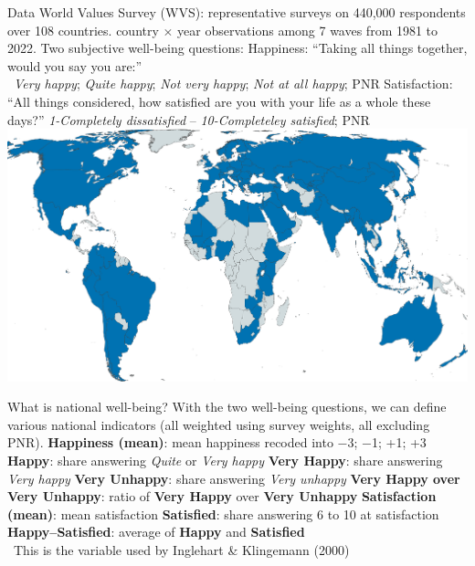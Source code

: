 \documentclass[aspectratio=169,xcolor=dvipsnames, 11pt,mathserif]{beamer}
\begin{document}
\begin{frame}{Data}
    \bbvsp
    \ip World Values Survey (WVS): representative surveys on 440,000 respondents over 108 countries.
     country $\times$ year observations among 7 waves from 1981 to 2022.
    \ip Two subjective well-being questions:
    \bbvsp 
    \ip Happiness: ``Taking all things together, would you say you are:'' \\ ~\textit{Very happy}; \textit{Quite happy}; \textit{Not very happy}; \textit{Not at all happy}; PNR %
    \ip Satisfaction: ``All things considered, how satisfied are you with your life as a whole these days?'' \textit{1-Completely dissatisfied} -- \textit{10-Completeley satisfied}; PNR %
    \ee
    \ee
    \centering \includegraphics[height=.5\textheight]{../figures/WVS_countries}
\end{frame}

\begin{frame}{What is national well-being?}
    With the two well-being questions, we can define various national indicators (all weighted using survey weights, all excluding PNR).
    \bbvsp
    \ip \textbf{Happiness (mean)}: mean happiness recoded into $-$3; $-$1; +1; +3
    \ip \textbf{Happy}: share answering \textit{Quite} or \textit{Very happy}
    \ip \textbf{Very Happy}: share answering \textit{Very happy}
    \ip \textbf{Very Unhappy}: share answering \textit{Very unhappy}
    \ip \textbf{Very Happy over Very Unhappy}: ratio of \textbf{Very Happy} over \textbf{Very Unhappy}
    \ip \textbf{Satisfaction (mean)}: mean satisfaction
    \ip \textbf{Satisfied}: share answering 6 to 10 at satisfaction
    \ip \textbf{Happy--Satisfied}: average of \textbf{Happy} and \textbf{Satisfied}\\ ~\quad This is the variable used by Inglehart \& Klingemann (2000) %
    \ee 
\end{frame}
\end{document}
